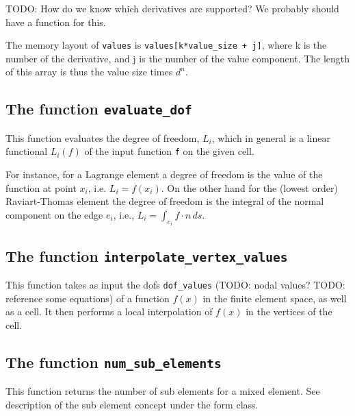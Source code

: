 TODO: How do we know which derivatives are supported? We probably should have a function for this.

The memory layout of \texttt{values} is
\texttt{values[k*value\_size + j]},
where k is the number of the derivative,
and j is the number of the value component.
The length of this array is thus the value size times $d^n$.



\subsection{The function \texttt{evaluate\_dof}}
This function evaluates the degree of freedom, $L_i$,  
which in general is a linear functional 
$L_i(f)$ of the input function \texttt{f}
on the given cell. 
  
For instance, for a Lagrange element a degree of
freedom is the value of the function at point $x_i$, i.e. $L_i = f(x_i)$. 
On the other hand for the (lowest order) Raviart-Thomas element 
the degree of freedom is the integral of the normal component
on the edge $e_i$, i.e., $L_i = \int_{e_i} f\cdot n \, ds$.  


\subsection{The function \texttt{interpolate\_vertex\_values}}
This function takes as input the dofs \texttt{dof\_values} (TODO: nodal values? TODO: reference some equations)
of a function $f(x)$ in the finite element space, as well as a cell.
It then performs a local interpolation of $f(x)$ in the vertices of the cell.


\subsection{The function \texttt{num\_sub\_elements}}
This function returns the number of sub elements for a mixed element.
See description of the sub element concept under the form class.


